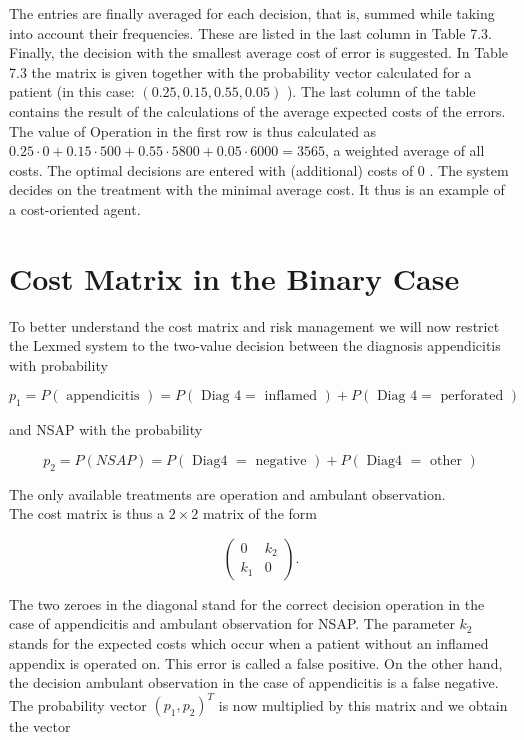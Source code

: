 \documentclass[10pt]{article}
\begin{document}
The entries are finally averaged for each decision, that is, summed while taking into account their frequencies. These are listed in the last column in Table 7.3. Finally, the decision with the smallest average cost of error is suggested. In Table 7.3 the matrix is given together with the probability vector calculated for a patient (in this case: $(0.25,0.15,0.55,0.05)$ ). The last column of the table contains the result of the calculations of the average expected costs of the errors. The value of Operation in the first row is thus calculated as $0.25 \cdot 0+0.15 \cdot 500+0.55 \cdot 5800+ 0.05 \cdot 6000=3565$, a weighted average of all costs. The optimal decisions are entered with (additional) costs of 0 . The system decides on the treatment with the minimal average cost. It thus is an example of a cost-oriented agent.

\section*{Cost Matrix in the Binary Case}
To better understand the cost matrix and risk management we will now restrict the Lexmed system to the two-value decision between the diagnosis appendicitis with probability

$$
p_{1}=P(\text { appendicitis })=P(\text { Diag } 4=\text { inflamed })+P(\text { Diag } 4=\text { perforated })
$$

and NSAP with the probability

$$
p_{2}=P(N S A P)=P(\text { Diag4 }=\text { negative })+P(\text { Diag4 }=\text { other })
$$

The only available treatments are operation and ambulant observation.\\
The cost matrix is thus a $2 \times 2$ matrix of the form

$$
\left(\begin{array}{cc}
0 & k_{2} \\
k_{1} & 0
\end{array}\right) .
$$

The two zeroes in the diagonal stand for the correct decision operation in the case of appendicitis and ambulant observation for NSAP. The parameter $k_{2}$ stands for the expected costs which occur when a patient without an inflamed appendix is operated on. This error is called a false positive. On the other hand, the decision ambulant observation in the case of appendicitis is a false negative. The probability vector $\left(p_{1}, p_{2}\right)^{T}$ is now multiplied by this matrix and we obtain the vector
\end{document}
